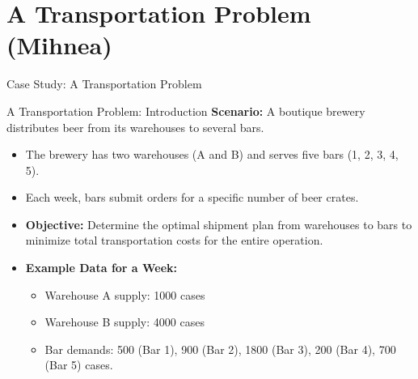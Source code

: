 \documentclass{purdue-slide}
\begin{document}
\section{A Transportation Problem (Mihnea)}

\begin{titleframe}{Case Study: A Transportation Problem}

\end{titleframe}

\begin{frame}{A Transportation Problem: Introduction}
	\textbf{Scenario:} A boutique brewery distributes beer from its warehouses to several bars.
	\begin{itemize}
		\item The brewery has two warehouses (A and B) and serves five bars (1, 2, 3, 4, 5).
		\item Each week, bars submit orders for a specific number of beer crates.
		\item \textbf{Objective:} Determine the optimal shipment plan from warehouses to bars to minimize total transportation costs for the entire operation.
		\item \textbf{Example Data for a Week:}
			\begin{itemize}
				\item Warehouse A supply: 1000 cases
				\item Warehouse B supply: 4000 cases
				\item Bar demands: 500 (Bar 1), 900 (Bar 2), 1800 (Bar 3), 200 (Bar 4), 700 (Bar 5) cases.
			\end{itemize}
	\end{itemize}
\end{frame}

\end{document}
